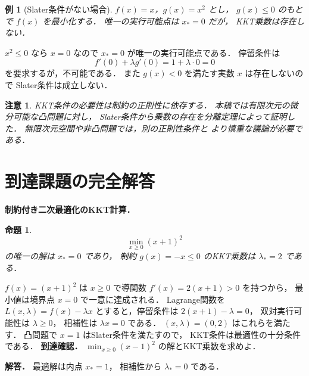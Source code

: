 \documentclass[a5paper,10pt,onecolumn]{jsarticle}
\makeatletter
\theoremstyle{mathnotetheorem}
\newtheorem{proposition}[theorem]{命題}
\newtheorem{example}[theorem]{例}
\newtheorem{remark}[theorem]{注意}
\renewcommand{\proofname}{証明}
\renewenvironment{proof}[1][\proofname]{%
  \par\pushQED{\qed}\normalfont\topsep4\p@\@plus2\p@\relax
  \trivlist\item[\hskip\labelsep\bfseries #1]\ignorespaces
}{\popQED\endtrivlist\@endpefalse}
\makeatother
\begin{document}
\begin{example}[Slater条件がない場合]
$f(x)=x$，$g(x)=x^2$ とし，
$g(x)\le0$ のもとで $f(x)$ を最小化する．
唯一の実行可能点は $x_*=0$ だが，
KKT乗数は存在しない．
\end{example}
\begin{proof}
$x^2\le0$ なら $x=0$ なので $x_*=0$ が唯一の実行可能点である．
停留条件は
\[
 f'(0)+\lambda g'(0)=1+\lambda\cdot0=0
\]
を要求するが，不可能である．
また $g(x)<0$ を満たす実数 $x$ は存在しないので
Slater条件は成立しない．
\end{proof}

\begin{remark}
KKT条件の必要性は制約の正則性に依存する．
本稿では有限次元の微分可能な凸問題に対し，
Slater条件から乗数の存在を分離定理によって証明した．
無限次元空間や非凸問題では，別の正則性条件と
より慎重な議論が必要である．
\end{remark}

\section{到達課題の完全解答}
\noindent\textbf{制約付き二次最適化のKKT計算．}
\begin{proposition}
\[
\min_{x\ge0}(x+1)^2
\]
の唯一の解は $x_*=0$ であり，
制約 $g(x)=-x\le0$ のKKT乗数は $\lambda_*=2$ である．
\end{proposition}
\begin{proof}
$f(x)=(x+1)^2$ は $x\ge0$ で導関数
$f'(x)=2(x+1)>0$ を持つから，
最小値は境界点 $x=0$ で一意に達成される．
Lagrange関数を $L(x,\lambda)=f(x)-\lambda x$
とすると，停留条件は
$2(x+1)-\lambda=0$，
双対実行可能性は $\lambda\ge0$，
相補性は $\lambda x=0$ である．
$(x,\lambda)=(0,2)$ はこれらを満たす．
凸問題で $x=1$ はSlater条件を満たすので，
KKT条件は最適性の十分条件である．
\end{proof}
\noindent\textbf{到達確認．}
$\min_{x\ge0}(x-1)^2$ の解とKKT乗数を求めよ．
\par\noindent\textbf{解答．}
最適解は内点 $x_*=1$，
相補性から $\lambda_*=0$ である．
\end{document}
